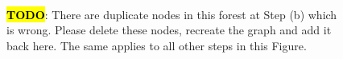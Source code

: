 \begin{figure}[ht]
{{}}
\\
\text \large \textcolor{red}{\textbf{\hl{TODO}}}: There are duplicate nodes
in this forest at Step (b) which is wrong. Please delete these nodes, recreate the 
graph and add it back here. The same applies to all other steps in this Figure.
\end{figure}
